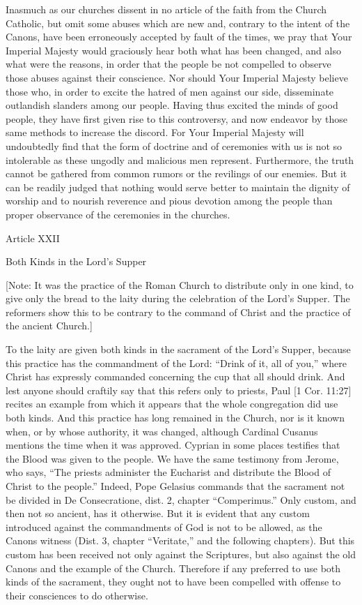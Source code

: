 Inasmuch as our churches dissent in no article of the faith from the Church Catholic, but omit some abuses which are new and, contrary to the intent of the Canons, have been erroneously accepted by fault of the times, we pray that Your Imperial Majesty would graciously hear both what has been changed, and also what were the reasons, in order that the people be not compelled to observe those abuses against their conscience. Nor should Your Imperial Majesty believe those who, in order to excite the hatred of men against our side, disseminate outlandish slanders among our people. Having thus excited the minds of good people, they have first given rise to this controversy, and now endeavor by those same methods to increase the discord. For Your Imperial Majesty will undoubtedly find that the form of doctrine and of ceremonies with us is not so intolerable as these ungodly and malicious men represent. Furthermore, the truth cannot be gathered from common rumors or the revilings of our enemies. But it can be readily judged that nothing would serve better to maintain the dignity of worship and to nourish reverence and pious devotion among the people than proper observance of the ceremonies in the churches.

 

Article XXII

Both Kinds in the Lord’s Supper

[Note: It was the practice of the Roman Church to distribute only in one kind, to give only the bread to the laity during the celebration of the Lord’s Supper. The reformers show this to be contrary to the command of Christ and the practice of the ancient Church.]

To the laity are given both kinds in the sacrament of the Lord’s Supper, because this practice has the commandment of the Lord: “Drink of it, all of you,” where Christ has expressly commanded concerning the cup that all should drink. And lest anyone should craftily say that this refers only to priests, Paul [1 Cor. 11:27] recites an example from which it appears that the whole congregation did use both kinds. And this practice has long remained in the Church, nor is it known when, or by whose authority, it was changed, although Cardinal Cusanus mentions the time when it was approved. Cyprian in some places testifies that the Blood was given to the people. We have the same testimony from Jerome, who says, “The priests administer the Eucharist and distribute the Blood of Christ to the people.” Indeed, Pope Gelasius commands that the sacrament not be divided in De Consecratione, dist. 2, chapter “Comperimus.” Only custom, and then not so ancient, has it otherwise. But it is evident that any custom introduced against the commandments of God is not to be allowed, as the Canons witness (Dist. 3, chapter “Veritate,” and the following chapters). But this custom has been received not only against the Scriptures, but also against the old Canons and the example of the Church. Therefore if any preferred to use both kinds of the sacrament, they ought not to have been compelled with offense to their consciences to do otherwise.

